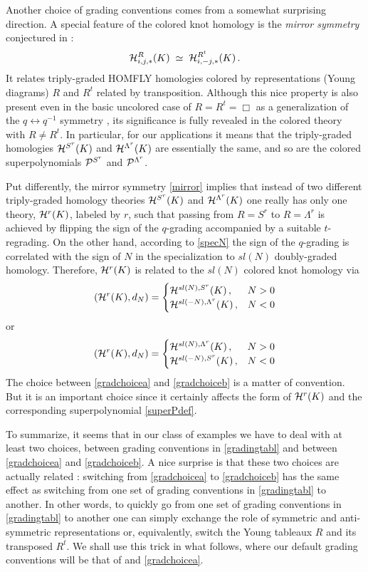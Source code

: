 \documentclass[hyper,letterpaper]{JHEP3}
\newcommand{\be}{\begin{equation}}
\newcommand{\ee}{\end{equation}}
\newcommand{\cH}{{\cal H }}
\renewcommand{\P}{{\cal P}}
\begin{document}
Another choice of grading conventions comes from a somewhat surprising direction.
A special feature of the colored knot homology is the {\it mirror symmetry} conjectured in \cite{GS}:
\be
\cH^{R}_{i,j,*} (K) \; \simeq \; \cH^{R^t}_{i,-j,*} (K) \,.
\label{mirror}
\ee
It relates triply-graded HOMFLY homologies colored by representations (Young diagrams) $R$ and $R^t$ related by transposition.
Although this nice property is also present even in the basic uncolored case of $R = R^t = \Box$
as a generalization of the $q \leftrightarrow q^{-1}$ symmetry \cite{DGR},
its significance is fully revealed in the colored theory with $R \ne R^t$.
In particular, for our applications it means that
the triply-graded homologies $\cH^{S^r} (K)$ and $\cH^{\Lambda^r} (K)$
are essentially the same, and so are the colored superpolynomials $\P^{S^r}$ and $\P^{\Lambda^r}$.

Put differently, the mirror symmetry \eqref{mirror} implies that instead of two different triply-graded homology theories
$\cH^{S^r} (K)$ and $\cH^{\Lambda^r} (K)$ one really has only one theory, $\cH^r (K)$, labeled by $r$,
such that passing from $R = S^r$ to $R = \Lambda^r$ is achieved by flipping the sign
of the $q$-grading accompanied by a suitable $t$-regrading.
On the other hand, according to \eqref{specN} the sign of the $q$-grading
is correlated with the sign of $N$ in the specialization to $sl(N)$ doubly-graded homology.
Therefore, $\cH^r (K)$ is related to the $sl(N)$ colored knot homology via
\be
\left( \cH^r (K) , d_N \right) =
\begin{cases}
\cH^{sl(N), S^r} (K) \,, & N>0 \\
\cH^{sl(-N), \Lambda^r} (K) \,, & N<0
\end{cases}
\label{gradchoicea}
\ee
or
\be
\left( \cH^r (K) , d_N \right) =
\begin{cases}
\cH^{sl(N), \Lambda^r} (K) \,, & N>0 \\
\cH^{sl(-N), S^r} (K) \,, & N<0
\end{cases}
\label{gradchoiceb}
\ee
The choice between \eqref{gradchoicea} and \eqref{gradchoiceb} is a matter of convention.
But it is an important choice since it certainly affects the form of $\cH^r (K)$
and the corresponding superpolynomial \eqref{superPdef}.

To summarize, it seems that in our class of examples we have to deal with at least two choices,
between grading conventions in \eqref{gradingtabl} and between \eqref{gradchoicea} and \eqref{gradchoiceb}.
A nice surprise is that these two choices are actually related \cite{GS}: switching from \eqref{gradchoicea} to \eqref{gradchoiceb}
has the same effect as switching from one set of grading conventions in \eqref{gradingtabl} to another.
In other words, to quickly go from one set of grading conventions in \eqref{gradingtabl} to another
one can simply exchange the role of symmetric and anti-symmetric representations or, equivalently,
switch the Young tableaux $R$ and its transposed $R^t$.
We shall use this trick in what follows, where our default grading conventions will be that of \cite{GS} and \eqref{gradchoicea}.\\
\end{document}
